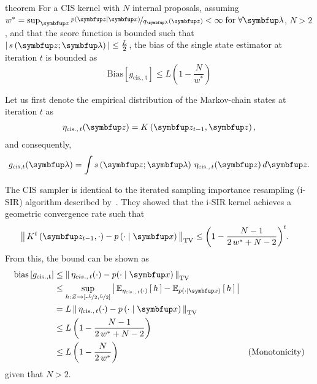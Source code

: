 
\begin{theoremEnd}{theorem}
  For a CIS kernel with \(N\) internal proposals,
  assuming \(w^* = \sup_{\vz} \nicefrac{p\left(\vz\mid\vx\right)}{q_{\vlambda}\left(\vz\right)} < \infty\; \text{for} \; \forall \vlambda \), \(N > 2\), and that the score function is bounded such that \(\left|\,s\left(\vz; \vlambda\right)\,\right| \leq \frac{L}{2}\), the bias of the single state estimator at iteration \(t\) is bounded as
  {\small
  \[
    \mathrm{Bias}\left[ g_{\mathrm{cis.,\, t}} \right] \leq L \left(1 - \frac{N}{w^*}\right)
  \]
  }
\end{theoremEnd}
\begin{proofEnd}
  Let us first denote the empirical distribution of the Markov-chain states at iteration \(t\) as
  \begin{align}
    \eta_{\mathrm{cis.},\, t}(\vz) = K\left(\vz_{t-1}, \vz\right),
  \end{align}
  and consequently,
  \begin{align}
      g_{\mathrm{cis}, t}(\vlambda) = \int s\left(\vz; \vlambda\right) \, \eta_{\mathrm{cis.},\, t}(\vz) \, d\vz.
  \end{align}

  The CIS sampler is identical to the iterated sampling importance resampling (i-SIR) algorithm described by~\citet{andrieu_uniform_2018}.
  They showed that the i-SIR kernel achieves a geometric convergence rate such that
  \begin{align}
    \DTV{K^{t}\left(\vz_{t-1},\cdot\right)}{p\left(\cdot\mid\vx\right)}
    &\leq {\left(1 - \frac{N - 1}{2\,w^* + N - 2}\right)}^t.
  \end{align}
  From this, the bound can be shown as
  \begin{align}
    \mathrm{bias}\left[ g_{\mathrm{cis., t}} \right]
    &\leq \DTV{\eta_{cis.,\, t}(\cdot)}{p(\cdot\mid\vx)} \\
    &\leq \sup_{h : \mathcal{Z} \rightarrow \left[ \text{-}\nicefrac{L}{2}, \nicefrac{L}{2} \right]} \left|\, \Esub{\eta_{\mathrm{cis.},\, t}(\cdot)}{h} - \Esub{p(\cdot\mid\vx)}{h} \,\right| \\
    &= L \, \DTV{ \eta_{\mathrm{cis.},\, t}(\cdot) }{p\left(\cdot\mid\vx\right)}  \\
    &\leq L \, {\left(1 - \frac{N - 1}{2\,w^* + N - 2}\right)} \\
    &\leq L \, {\left(1 - \frac{N}{2 \, w^*}\right)} &(\text{Monotonicity})
  \end{align}
  given that \(N > 2\).
\end{proofEnd}

